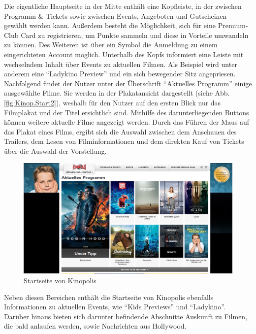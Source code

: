 	Die eigentliche Hauptseite in der Mitte enthält eine Kopfleiste, in der zwischen Programm \& Tickets sowie zwischen Events, Angeboten und Gutscheinen gewählt werden kann. Außerdem besteht die Möglichkeit, sich für eine Premium-Club Card zu registrieren, um Punkte sammeln und diese in Vorteile umwandeln zu können. Des Weiteren ist über ein Symbol die Anmeldung zu einem eingerichteten Account möglich. Unterhalb des Kopfs informiert eine Leiste mit wechselndem Inhalt über Events zu aktuellen Filmen. Als Beispiel wird unter anderem eine \enquote{Ladykino Preview} und ein sich bewegender Sitz angepriesen. 
	\\Nachfolgend findet der Nutzer unter der Überschrift \enquote{Aktuelles Programm} einige ausgewählte Filme. Sie werden in der Plakatansicht dargestellt (siehe Abb. \vref{fig:Kinop.Start2}), weshalb für den Nutzer auf den ersten Blick nur das Filmplakat und der Titel ersichtlich sind. Mithilfe des darunterliegenden Buttons können weitere aktuelle Filme angezeigt werden. Durch das Führen der Maus auf das Plakat eines Films, ergibt sich die Auswahl zwischen dem Anschauen des Trailers, dem Lesen von Filminformationen und dem direkten Kauf von Tickets über die Auswahl der Vorstellung.
	\begin{figure}
		\centering 
		\includegraphics[width=14cm]{img/Kinopolis_MA_Start2.png}
		\captionsetup{format=hang}
		\centering\caption[Startseite von Kinopolis Viernheim]{\label{fig:Kinop.Start2}Startseite von Kinopolis\footnotemark}
	\end{figure}
	Neben diesen Bereichen enthält die Startseite von Kinopolis ebenfalls Informationen zu aktuellen Events, wie \enquote{Kids Previews} und \enquote{Ladykino}. Darüber hinaus bieten sich darunter befindende Abschnitte Auskunft zu Filmen, die bald anlaufen werden, sowie Nachrichten aus Hollywood. 
	
